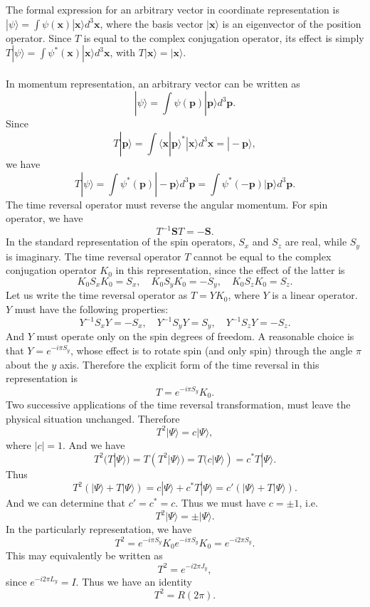 The formal expression for an arbitrary vector in coordinate representation is $|\psi\rangle = \int \psi(\bm{x})|\bm{x}\rangle d^3 \bm{x}$, where the basis vector $|\bm{x}\rangle$ is an eigenvector of the position operator. Since $T$ is equal to the complex conjugation operator, its effect is simply $T|\psi\rangle = \int \psi^*(\bm{x})|\bm{x}\rangle d^3 \bm{x}$, with $T|\bm{x}\rangle = |\bm{x}\rangle$.
\\ \\
In momentum representation, an arbitrary vector can be written as
\[|\psi\rangle = \int \psi(\bm{p})|\bm{p}\rangle d^3 \bm{p}.\]
Since
\[T|\bm{p}\rangle = \int \langle \bm{x} | \bm{p}\rangle^* |
\bm{x}\rangle d^3 \bm{x} = |-\bm{p}\rangle,\]
we have
\[T|\psi\rangle = \int \psi^*(\bm{p})|-\bm{p}\rangle d^3 \bm{p} = \int \psi^*(\bm{-p})|\bm{p}\rangle d^3 \bm{p}.\]
The time reversal operator must reverse the angular momentum. For spin operator, we have
\[T^{-1}\bm{S}T = -\bm{S}.\]
In the standard representation of the spin operators, $S_x$ and $S_z$ are real, while $S_y$ is imaginary. The time reversal operator $T$ cannot be equal to the complex conjugation operator $K_0$ in this representation, since the effect of the latter is
\[K_0S_xK_0 = S_x , \quad K_0S_yK_0 = -S_y , \quad K_0S_zK_0 = S_z.\]
Let us write the time reversal operator as $T=YK_0$, where $Y$ is a linear operator. $Y$ must have the following properties:
\[Y^{-1}S_xY = -S_x , \quad Y^{-1}S_yY = S_y , \quad Y^{-1}S_zY = -S_z.\]
And $Y$ must operate only on the spin degrees of freedom. A reasonable choice is that $Y = e^{-i\pi S_y}$, whose effect is
to rotate spin (and only spin) through the angle $\pi$ about the $y$ axis. Therefore the explicit form of the time reversal in this representation is
\[T = e^{-i\pi S_y}K_0.\]
Two successive applications of the time reversal transformation, must leave the physical situation unchanged. Therefore
\[T^2|\Psi\rangle = c|\Psi\rangle,\]
where $|c|=1$. And we have
\[T^2(T|\Psi\rangle) = T(T^2|\Psi\rangle) = T(c|\Psi\rangle) = c^* T|\Psi\rangle.\]
Thus 
\[T^2(|\Psi\rangle + T|\Psi\rangle) = c|\Psi\rangle + c^* T|\Psi\rangle = c'(|\Psi\rangle + T|\Psi\rangle).\]
And we can determine that $c' = c^* = c$. Thus we must have $c = \pm 1$, i.e.
\[T^2|\Psi\rangle = \pm |\Psi\rangle.\]
In the particularly representation, we have
\[T^2 = e^{-i\pi S_y}K_0 e^{-i\pi S_y}K_0 = e^{-i2\pi S_y}.\]
This may equivalently be written as
\[T^2 = e^{-i2\pi J_y},\]
since $e^{-i2\pi L_y} = I$. Thus we have an identity
\[T^2 = R(2\pi).\]

